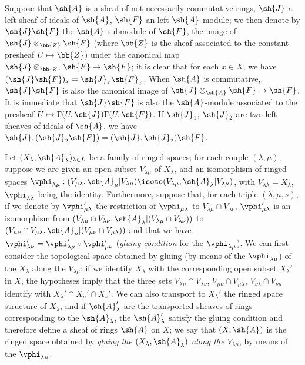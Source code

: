 \begin{env}[4.1.6]
\label{0.4.1.6}
Suppose that $\sh{A}$ is a sheaf of not-necessarily-commutative rings, $\sh{J}$
a left sheaf of ideals of $\sh{A}$, $\sh{F}$ an left $\sh{A}$-module; we then
denote by $\sh{J}\sh{F}$ the $\sh{A}$-submodule of $\sh{F}$, the image of
$\sh{J}\otimes_\bb{Z}\sh{F}$ (where $\bb{Z}$ is the sheaf associated to the
constant presheaf $U\mapsto\bb{Z}$) under the canonical map
$\sh{J}\otimes_\bb{Z}\sh{F}\to\sh{F}$; it is clear that for each $x\in X$, we
have $(\sh{J}\sh{F})_x=\sh{J}_x\sh{F}_x$. When $\sh{A}$ is commutative,
$\sh{J}\sh{F}$ is also the canonical image of
$\sh{J}\otimes_\sh{A}\sh{F}\to\sh{F}$. It is immediate that $\sh{J}\sh{F}$ is
also the $\sh{A}$-module associated to the presheaf
$U\mapsto\Gamma(U,\sh{J})\Gamma(U,\sh{F})$. If $\sh{J}_1$, $\sh{J}_2$ are two
left sheaves of ideals of $\sh{A}$, we have
$\sh{J}_1(\sh{J}_2\sh{F})=(\sh{J}_1\sh{J}_2)\sh{F}$.
\end{env}

\begin{env}[4.1.7]
\label{0.4.1.7}
Let $(X_\lambda,\sh{A}_\lambda)_{\lambda\in L}$ be a family of ringed spaces;
for each couple $(\lambda,\mu)$, suppose we are given an open subset
$V_{\lambda\mu}$ of $X_\lambda$, and an isomorphism of ringed spaces
$\vphi_{\lambda\mu}:(V_{\mu\lambda},\sh{A}_\mu|V_{\lambda\mu})
  \isoto(V_{\lambda\mu},\sh{A}_\lambda|V_{\lambda\mu})$, with
$V_{\lambda\lambda}=X_\lambda$, $\vphi_{\lambda\lambda}$ being the identity.
Furthermore, suppose that, for each triple $(\lambda,\mu,\nu)$, if we denote by
$\vphi_{\mu\lambda}'$ the restriction of $\vphi_{\mu\lambda}$ to
$V_{\lambda\mu}\cap V_{\lambda\nu}$, $\vphi_{\mu\lambda}'$ is an isomorphism
from $(V_{\lambda\mu}\cap V_{\lambda\nu},
  \sh{A}_\lambda|(V_{\lambda\mu}\cap V_{\lambda\nu}))$ to
$(V_{\mu\nu}\cap V_{\mu\lambda},\sh{A}_\mu|(V_{\mu\nu}\cap V_{\mu\lambda}))$ and
that we have $\vphi_{\lambda\nu}'=\vphi_{\lambda\mu}'\circ\vphi_{\mu\nu}'$
(\emph{gluing condition} for the $\vphi_{\lambda\mu}$). We can first consider
the topological space obtained by gluing (by means of the $\vphi_{\lambda\mu}$)
of the $X_\lambda$
along the $V_{\lambda\mu}$; if we identify $X_\lambda$ with the corresponding
open subset $X_\lambda'$ in $X$, the hypotheses imply that the three sets
$V_{\lambda\mu}\cap V_{\lambda\nu}$, $V_{\mu\nu}\cap V_{\mu\lambda}$,
$V_{\nu\lambda}\cap V_{\nu\mu}$ identify with
$X_\lambda'\cap X_\mu'\cap X_\nu'$. We can also transport to $X_\lambda'$ the
ringed space structure of $X_\lambda$, and if $\sh{A}_\lambda'$ are the
transported sheaves of rings corresponding to the $\sh{A}_\lambda$, the
$\sh{A}_\lambda'$ satisfy the gluing condition  and therefore
define a sheaf of rings $\sh{A}$ on $X$; we say that $(X,\sh{A})$ is the ringed
space obtained by \emph{gluing the $(X_\lambda,\sh{A}_\lambda)$ along the
$V_{\lambda\mu}$}, by means of the $\vphi_{\lambda\mu}$.
\end{env}

